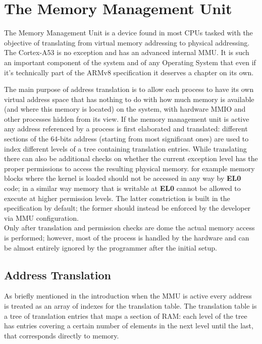 \documentclass[12pt,a4paper,openright,twoside]{report}
\begin{document}
\clearpage{\pagestyle{empty}\cleardoublepage}
\chapter{The Memory Management Unit}
\label{mmu}
The Memory Management Unit is a device found in most CPUs tasked with the objective
of translating from virtual memory addressing to physical addressing. The Cortex-A53
is no exception and has an advanced internal MMU. It is such an important component
of the system and of any Operating System that even if it's technically 
part of the ARMv8 specification it deserves a chapter on its own.

The main purpose of address translation is to allow each process to have its own
virtual address space that has nothing to do with how much memory is available 
(and where this memory is located) on the system, with hardware MMIO and other
processes hidden from its view.
If the memory management unit is active any address referenced by a process is first
elaborated and translated: different sections of the 64-bits address (starting
from most significant ones) are used to index different levels of a tree containing
translation entries. While translating there can also be additional checks on 
whether the current exception level has the proper permissions to access 
the resulting physical memory. for example memory blocks where the kernel is loaded
should not be accessed in any way by \textbf{EL0} code; in a similar way memory
that is writable at \textbf{EL0} cannot be allowed to execute at higher permission
levels. The latter constriction is built in the specification by default; the former
should instead be enforced by the developer via MMU configuration.\\
Only after translation and permission checks are dome the actual memory access 
is performed; however, most of the process is handled by the hardware and 
can be almost entirely ignored by the programmer after the initial setup.

\section{Address Translation}
As briefly mentioned in the introduction when the MMU is active every address is 
treated as an array of indexes for the translation table. The translation table is 
a tree of translation entries that maps a section of RAM: each level of the 
tree has entries covering a certain number of elements in the next level until the 
last, that corresponds directly to memory.\\
\end{document}
